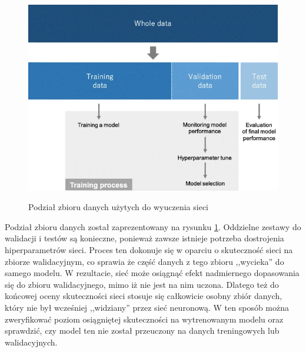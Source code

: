\begin{figure}[h]
\begin{center}
\includegraphics[width=15cm]{resources/figures/datasets.png}
\caption{Podział zbioru danych użytych do wyuczenia sieci}
\label{DatasetDivision}
\end{center}
\end{figure}

Podział zbioru danych został zaprezentowany na rysunku \ref{DatasetDivision}. Oddzielne zestawy do walidacji i testów są konieczne, ponieważ zawsze istnieje potrzeba dostrojenia hiperparametrów sieci. Proces ten dokonuje się w oparciu o skuteczność sieci na zbiorze walidacyjnym, co sprawia że część danych z tego zbioru ,,wycieka'' do samego modelu. W rezultacie, sieć może osiągnąć efekt nadmiernego dopasowania się \cite{goyal:overfittingGuide} do zbioru walidacyjnego, mimo iż nie jest na nim uczona. Dlatego też do końcowej oceny skuteczności sieci stosuje się całkowicie osobny zbiór danych, który nie był wcześniej ,,widziany'' przez sieć neuronową. W ten sposób można zweryfikować poziom osiągniętej skuteczności na wytrenowanym modelu oraz sprawdzić, czy model ten nie został przeuczony na danych treningowych lub walidacyjnych.

\clearpage
